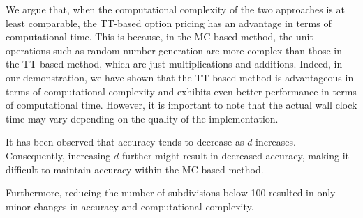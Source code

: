 We argue that, when the computational complexity of the two approaches is at least comparable, the TT-based option pricing has an advantage in terms of computational time. 
This is because, in the MC-based method, the unit operations such as random number generation are more complex than those in the TT-based method, which are just multiplications and additions. 
Indeed, in our demonstration, we have shown that the TT-based method is advantageous in terms of computational complexity and exhibits even better performance in terms of computational time. However, it is important to note that the actual wall clock time may vary depending on the quality of the implementation.

It has been observed that accuracy tends to decrease as \(d\) increases. Consequently, increasing \(d\) further might result in decreased accuracy, making it difficult to maintain accuracy within the MC-based method. 

Furthermore, reducing the number of subdivisions below 100 resulted in only minor changes in accuracy and computational complexity.

